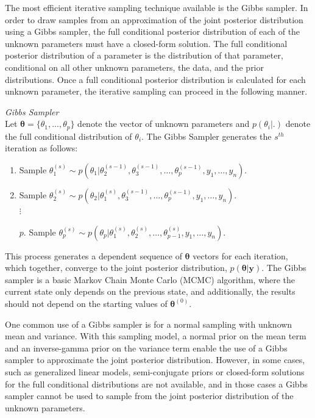 \documentclass[12pt]{article}\usepackage[]{graphicx}\usepackage[]{color}
\begin{document}
The most efficient iterative sampling technique available is the Gibbs sampler. In order to draw samples from an approximation of the joint posterior distribution using a Gibbs sampler, the full conditional posterior distribution of each of the unknown parameters must have a closed-form solution. The full conditional posterior distribution of a parameter is the distribution of that parameter, conditional on all other unknown parameters, the data, and the prior distributions. Once a full conditional posterior distribution is calculated for each unknown parameter, the iterative sampling can proceed in the following manner. 

\begin{mdframed}
\textit{Gibbs Sampler} \\
Let $\bm{\theta} = \{\theta_1, ..., \theta_p\}$ denote the vector of unknown parameters and $p(\theta_i|.)$ denote the full conditional distribution of $\theta_i$. The Gibbs Sampler generates the $s^{th}$ iteration as follows:
\begin{enumerate}
\item Sample $\theta_1^{(s)} \sim p(\theta_1|\theta_2^{(s-1)}, \theta_3^{(s-1)}, \dots, \theta_p^{(s-1)}, y_1, \dots, y_n)$. 
\item Sample $\theta_2^{(s)} \sim p(\theta_2|\theta_1^{(s)}, \theta_3^{(s-1)}, \dots, \theta_p^{(s-1)}, y_1, \dots, y_n)$.\\	
$\vdots$ \\[-14mm]
\item[$p$.] Sample $\theta_p^{(s)} \sim p(\theta_p|\theta_1^{(s)}, \theta_2^{(s)}, \dots, \theta_{p-1}^{(s)}, y_1, \dots , y_n)$. 
\end{enumerate}
\end{mdframed}

\noindent This process generates a dependent sequence of $\bm{\theta}$ vectors for each iteration, which together, converge to the joint posterior distribution, $p(\bm{\theta}|\bm{y})$. The Gibbs sampler is a basic Markov Chain Monte Carlo (MCMC) algorithm, where the current state only depends on the previous state, and additionally, the results should not depend on the starting values of $\bm{\theta}^{(0)}$.

One common use of a Gibbs sampler is for a normal sampling with unknown mean and variance. With this sampling model, a normal prior on the mean term and an inverse-gamma prior on the variance term enable the use of a Gibbs sampler to approximate the joint posterior distribution. However, in some cases, such as generalized linear models, semi-conjugate priors or closed-form solutions for the full conditional distributions are not available, and in those cases a Gibbs sampler cannot be used to sample from the joint posterior distribution of the unknown parameters. 
\end{document}
